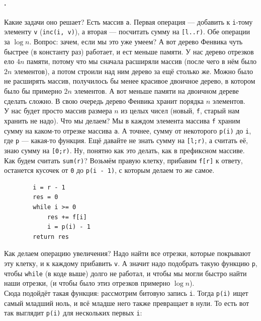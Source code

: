 \documentclass{article}
\newcommand{\pseudo}{PseudoLexer.py:PseudoLexer -x}
\newcommand{\pseudocode}[1]{\texttt{#1}}
\begin{document}
    \paragraph{.}
    Какие задачи оно решает? Есть массив \pseudocode{a}. Первая операция --- добавить к \pseudocode{i}-тому элементу \pseudocode{v} (\pseudocode{inc(i, v)}), а вторая --- посчитать сумму на \pseudocode{[l..r)}. Обе операции за $\log n$. Вопрос: зачем, если мы это уже умеем? А вот дерево Фенвика чуть быстрее (в константу раз) работает, и ест меньше памяти. У нас дерево отрезков ело $4n$ памяти, потому что мы сначала расширяли массив (после чего в нём было $2n$ элементов), а потом строили над ним дерево за ещё столько же. Можно было не расширять массив, получилось бы менее красивое двоичное дерево, в котором было бы примерно $2n$ элементов. А вот меньше памяти на двоичном дереве сделать сложно. В свою очередь дерево Фенвика хранит порядка $n$ элементов.\\
    У нас будет просто массив размера $n$ из целых чисел (новый, \pseudocode{f}, старый нам хранить не надо). Что мы делаем? Мы в каждом элемента массива \pseudocode{f} храним сумму на каком-то отрезке массива \pseudocode{a}. А точнее, сумму от некоторого \pseudocode{p(i)} до \pseudocode{i}, где \pseudocode{p} --- какая-то функция. Ещё давайте не знать сумму на \pseudocode{[l;r)}, а считать её, знаю сумму на \pseudocode{[0;r)}. Ну, понятно как это делать, как в префиксном массиве. Как будем считать \pseudocode{sum(r)}? Возьмём правую клетку, прибавим \pseudocode{f[r]} к ответу, останется кусочек от \pseudocode{0} до \pseudocode{p(i - 1)}, с которым делаем то же самое.
    \begin{verbatim}
        i = r - 1
        res = 0
        while i >= 0
            res += f[i]
            i = p(i) - 1
        return res
    \end{verbatim}
    Как делаем операцию увеличения? Надо найти все отрезки, которые покрывают эту клетку, и к каждому прибавить \pseudocode{v}. А значит надо подобрать такую функцию \pseudocode{p}, чтобы \pseudocode{while} (в коде выше) долго не работал, и чтобы мы могли быстро найти наши отрезки, (и чтобы было этиз отрезков примерно $\log n$).\\
    Сюда подойдёт такая функция: рассмотрим битовую запись \pseudocode{i}. Тогда \pseudocode{p(i)} ищет самый младший ноль, и всё младше него также превращает в нули. То есть вот так выглядит \pseudocode{p(i)} для нескольких первых \pseudocode{i}:
\end{document}
